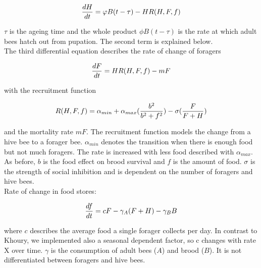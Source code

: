 	\begin{equation}\label{eq:changeHiveBees}
		{dH \over dt}=\phi B(t-\tau)-HR(H,F,f)
	\end{equation}
	
	$\tau$ is the ageing time and the whole product $\phi B(t-\tau)$ is the rate at which adult bees hatch out from pupation. The second term is explained below.\\ 
	The third differential equation describes the rate of change of foragers
	
	\begin{equation}\label{eq:changeForagers}
		{dF \over dt} = HR(H,F,f)-m F
	\end{equation}
	
	with the recruitment function
	
	\begin{equation}\label{eq:recruitmentFunction}
		R(H,F,f) = \alpha_{min} + \alpha_{max}({b^2 \over b^2+f^2})-\sigma({F \over F+H})
	\end{equation}
	
	and the mortality rate $mF$. The recruitment function models the change from a hive bee to a forager bee. $\alpha_{min}$ denotes the transition when there is enough food but not much foragers. The rate is increased with less food described with $\alpha_{max}$. As before, $b$ is the food effect on brood survival and $f$ is the amount of food. $\sigma$ is the strength of social inhibition and is dependent on the number of foragers and hive bees.\\
	Rate of change in food stores:
	
	\begin{equation}\label{eq:changeFoodStoreConst}
		{df \over dt} = c F - \gamma_A (F+H) - \gamma_B B
	\end{equation}
	
	where $c$ describes the average food a single forager collects per day. In contrast to Khoury, we implemented also a seasonal dependent factor, so c changes with rate X over time. $\gamma$ is the consumption of adult bees ($A$) and brood ($B$). It is not differentiated between foragers and hive bees.  


